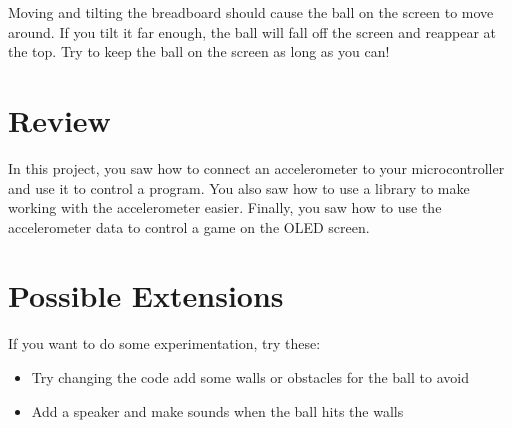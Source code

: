 Moving and tilting the breadboard should cause the ball on the screen to move around. If you tilt it far enough, the ball will
fall off the screen and reappear at the top. Try to keep the ball on the screen as long as you can!

\section{Review}

In this project, you saw how to connect an accelerometer to your microcontroller and use it to
control a program. You also saw how to use a library to make working with the accelerometer
easier. Finally, you saw how to use the accelerometer data to control a game on the OLED screen.

\section{Possible Extensions}
If you want to do some experimentation, try these:

\begin{itemize}
    \item Try changing the code add some walls or obstacles for the ball to avoid
    \item Add a speaker and make sounds when the ball hits the walls
\end{itemize}
